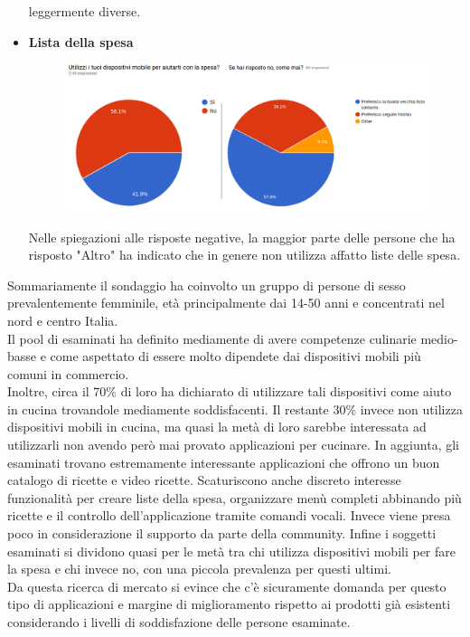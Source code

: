 \begin{itemize}
leggermente diverse.
	\item \textbf{Lista della spesa}
		\begin{figure} [H]
			\centering
			\includegraphics[scale=0.40]{img/survey-1112.png}
		\end{figure}
	Nelle spiegazioni alle risposte negative, la maggior parte delle
persone che ha risposto "Altro" ha indicato che in genere non
utilizza affatto liste delle spesa.
\end{itemize}

Sommariamente il sondaggio ha coinvolto un gruppo di persone di sesso
prevalentemente
femminile, età principalmente dai 14-50 anni e concentrati
nel nord e centro Italia.\\
Il pool di esaminati ha definito mediamente di avere competenze culinarie
medio-basse e come aspettato di essere molto dipendete dai dispositivi
mobili più comuni in commercio. \\

Inoltre, circa il 70\% di loro ha dichiarato di
utilizzare tali dispositivi come aiuto in cucina trovandole mediamente
soddisfacenti. Il restante
30\% invece non utilizza dispositivi mobili in cucina, ma 
quasi la metà di loro sarebbe interessata ad utilizzarli non avendo però
mai provato applicazioni per cucinare.
In aggiunta, gli esaminati trovano estremamente interessante
applicazioni che offrono un buon catalogo di ricette e video ricette.
Scaturiscono anche discreto interesse funzionalità per creare liste
della spesa, organizzare menù completi abbinando più ricette e il
controllo dell'applicazione tramite comandi vocali. Invece viene presa
poco in considerazione il supporto da parte della community.
Infine i soggetti esaminati si dividono quasi per le metà tra chi
utilizza dispositivi mobili per fare la spesa e chi invece no, con una
piccola prevalenza per questi ultimi.\\

Da questa ricerca di mercato si evince che c'è sicuramente domanda per
questo tipo di applicazioni e margine di miglioramento rispetto ai prodotti
già esistenti considerando i livelli di soddisfazione delle persone
esaminate.
